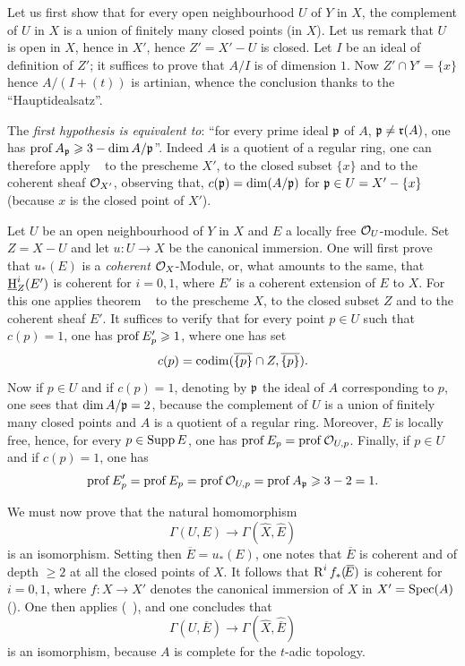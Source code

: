 Let us first show that for every open neighbourhood $U$ of $Y$ in $X$,
the complement of $U$ in $X$ is a union of finitely many closed points
(in $X$). Let us remark that $U$ is open in $X$, hence in $X'$, hence
$Z'=X'-U$ is closed. Let $I$ be an ideal of definition of $Z'$; it
suffices to prove that $A/I$ is of dimension $1$. Now $Z'\cap Y'=\{x\}$
hence $A/(I+(t))$ is artinian, whence the conclusion thanks to the
``Hauptidealsatz''.

The \emph{first hypothesis is equivalent to}: ``for every prime ideal
$\mathfrak{p}$ of $A$, $\mathfrak{p}\neq \mathfrak{r}(A)$, one has
$\operatorname{prof} A_{\mathfrak{p}}\geqslant3-\dim A/\mathfrak{p}$''. Indeed $A$ is a quotient of a regular
ring, one can therefore apply ~ to the
prescheme $X'$, to the closed subset $\{x\}$ and to the coherent sheaf
${\mathcal O}_{X'}$, observing that, $c(\mathfrak{p})=\dim(A/\mathfrak{p})$ for
$\mathfrak{p}\in U=X'-\{x\}$ (because $x$ is the closed point of $X'$).

Let $U$ be an open neighbourhood of $Y$ in $X$ and $E$ a locally free
${\mathcal O}_U$-module. Set $Z=X-U$ and let $u\colon U\to X$ be the canonical
immersion. One will first prove that $u_\ast(E)$ is a \emph{coherent}
$\mathcal{O}_X$-Module, or, what amounts to the same, that $\operatorname{\underline{H}}^i_Z(E')$ is
coherent for $i=0, 1$, where $E'$ is a coherent extension of $E$ to
$X$. For this one applies theorem ~ to the
prescheme $X$, to the closed subset $Z$ and to the coherent sheaf
$E'$. It suffices to verify that for every point $p\in U$ such that
$c(p)=1$, one has $\operatorname{prof} E'_p\geqslant 1$, where one has set
\[
c(p)=\operatorname{codim} (\overline{\{p\}}\cap Z, \overline{\{p\}}).
\]
Now if $p\in U$ and if $c(p)=1$, denoting by $\mathfrak{p}$ the ideal of $A$
corresponding to $p$, one sees that $\dim A/\mathfrak{p}=2$, because the
complement of $U$ is a union of finitely many closed points and $A$ is
a quotient of a regular ring. Moreover, $E$ is locally free, hence, for
every $p\in\operatorname{Supp} E$, one has $\operatorname{prof} E_p=\operatorname{prof}{\mathcal O}_{U, p}$. Finally, if
$p\in U$ and if $c(p)=1$, one has
\[
\operatorname{prof} E'_p = \operatorname{prof} E_p = \operatorname{prof}{\mathcal O}_{U, p} = \operatorname{prof} A_{\mathfrak{p}} \geqslant 3-2=1.
\]

We must now prove that the natural homomorphism
\begin{equation} \label{eq:X.1} {\Gamma(U, E) \to \Gamma(\hat{X}, \hat{E})}
\end{equation}
is an isomorphism. Setting then $\overline{\!E}=u_\ast(E)$, one notes
that $\overline{\!E}$ is coherent and of depth $\geq 2$ at all the
closed points of $X$. It follows that $\operatorname{R}^i f_\ast(\overline{\!E})$ is
coherent for $i=0, 1$, where $f\colon X\to X'$ denotes the canonical
immersion of $X$ in $X'=\operatorname{Spec}(A)$ (\Exp {}). One then applies
(~), and one concludes that
\begin{equation} \label{eq:X.2}
\Gamma(U, \overline{\!E}) \to \Gamma(\hat{X}, \widehat{\overline{\!E}})
\end{equation}
is an isomorphism, because $A$ is complete for the $t$-adic topology.

